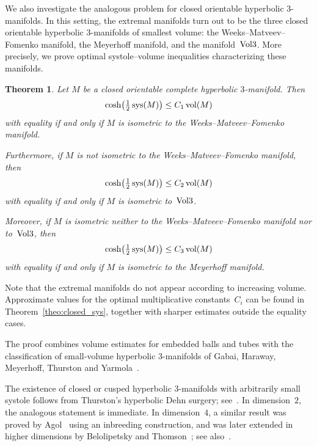 \documentclass[11pt,reqno]{amsart}
\newtheorem{theorem}{Theorem}[section]
\theoremstyle{definition}
\numberwithin{equation}{section}
\DeclareMathOperator{\vol}{{\rm vol}}
\DeclareMathOperator{\sys}{{\rm sys}}
\numberwithin{equation}{section}
\begin{document}
\medskip

We also investigate the analogous problem for closed orientable hyperbolic $3$-manifolds. 
In this setting, the extremal manifolds turn out to be the three closed orientable hyperbolic $3$-manifolds of smallest volume: the Weeks--Matveev--Fomenko manifold, the Meyerhoff manifold, and the manifold~${\rm Vol}3$.
More precisely, we prove optimal systole--volume inequalities characterizing these manifolds.

\begin{theorem}
Let $M$ be a closed orientable complete hyperbolic $3$-manifold.
Then
\[
\cosh \!\left(\tfrac{1}{2} \sys(M) \right) \leq C_1 \vol(M)
\]
with equality if and only if $M$ is isometric to the Weeks--Matveev--Fomenko manifold.

Furthermore, if $M$ is not isometric to the Weeks--Matveev--Fomenko manifold, then 
\[
\cosh \!\left(\tfrac{1}{2} \sys(M) \right) \leq C_2 \vol(M)
\]
with equality if and only if $M$ is isometric to~${\rm Vol}3$.

Moreover, if $M$ is isometric neither to the Weeks--Matveev--Fomenko manifold nor to~${\rm Vol}3$, then 
\[
\cosh \!\left(\tfrac{1}{2} \sys(M) \right) \leq C_3 \vol(M)
\]
with equality if and only if $M$ is isometric to the Meyerhoff manifold.
%
\end{theorem}

Note that the extremal manifolds do not appear according to increasing volume.
Approximate values for the optimal multiplicative constants~$C_i$ can be found in Theorem~\ref{theo:closed_sys}, together with sharper estimates outside the equality cases.

\medskip

The proof combines volume estimates for embedded balls and tubes with the classification of small-volume hyperbolic $3$-manifolds of Gabai, Haraway, Meyerhoff, Thurston and Yarmola~\cite{GHMTY}.

\medskip

The existence of closed or cusped hyperbolic $3$-manifolds with arbitrarily small systole follows from Thurston's hyperbolic Dehn surgery; see~\cite[\S 5.8]{thurston}.
In dimension~$2$, the analogous statement is immediate.
In dimension~$4$, a similar result was proved by Agol~\cite{A} using an inbreeding construction, and was later extended in higher dimensions by Belolipetsky and Thomson~\cite{BT}; see also~\cite[last remark]{BHW}. \\
\end{document}
